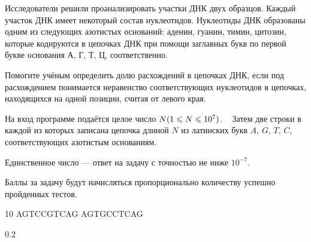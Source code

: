 
Исследователи решили проанализировать участки ДНК двух образцов. 
Каждый участок ДНК имеет некоторый состав нуклеотидов. Нуклеотиды ДНК образованы одним из следующих азотистых 
оснований: аденин, гуанин, тимин, цитозин, которые кодируются в цепочках ДНК при помощи заглавных 
букв по первой букве основания А, Г, Т, Ц, соответственно.

Помогите учёным определить долю расхождений в цепочках ДНК, если под расхождением понимается неравенство 
соответствующих нуклеотидов в цепочках, находящихся на одной позиции, считая от левого края.

На вход программе подаётся целое число $N\space(1\leq N \leq 10^7)$.  
Затем две строки в каждой из которых записана цепочка длиной $N$ из латинских букв $A$, $G$, $T$, $C$, 
соответствующих азотистым основаниям.

\outputfmtSection
Единственное число — ответ на задачу с точностью не ниже $10^{-7}$.

\markSection

Баллы за задачу будут начисляться пропорционально количеству успешно пройденных тестов.


\begin{myverbbox}[\small]{\vinput}
10
AGTCCGTCAG
AGTGCCTCAG
\end{myverbbox}
\begin{myverbbox}[\small]{\voutput}
0.2
\end{myverbbox}

